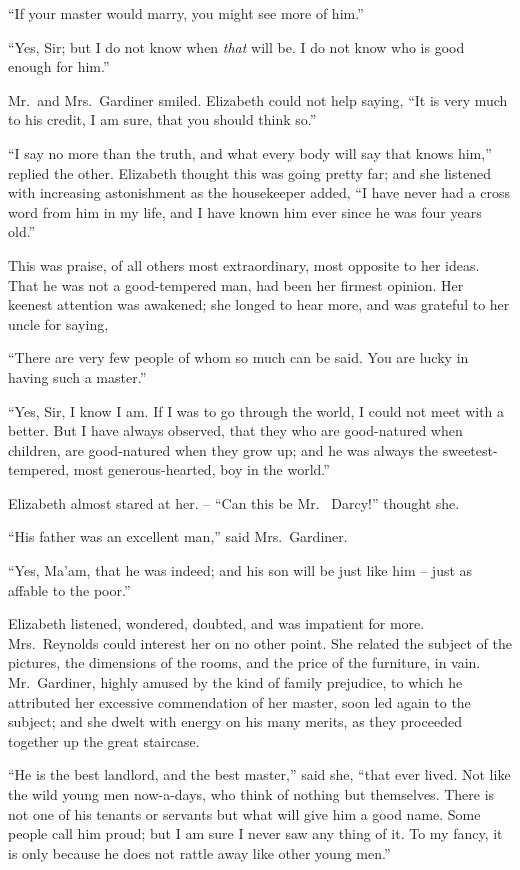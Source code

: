 “If your master would marry, you might see more of
him.”

“Yes, Sir; but I do not know when \textit{that} will be. I do
not know who is good enough for him.”

Mr.\ and Mrs.\ Gardiner smiled. Elizabeth could not
help saying, “It is very much to his credit, I am sure, that
you should think so.”

“I say no more than the truth, and what every body
will say that knows him,” replied the other. Elizabeth
thought this was going pretty far; and she listened with
increasing astonishment as the housekeeper added,
“I have never had a cross word from him in my
life, and I have known him ever since he was four years
old.”

This was praise, of all others most extraordinary, most
opposite to her ideas. That he was not a good-tempered
man, had been her firmest opinion. Her keenest attention
was awakened; she longed to hear more, and was grateful
to her uncle for saying,

“There are very few people of whom so much can be
said. You are lucky in having such a master.”

“Yes, Sir, I know I am. If I was to go through the
world, I could not meet with a better. But I have always
observed, that they who are good-natured when children,
are good-natured when they grow up; and he was always
the sweetest-tempered, most generous-hearted, boy in the
world.”

Elizabeth almost stared at her. -- “Can this be Mr.\ %
Darcy!” thought she.

“His father was an excellent man,” said Mrs.\ Gardiner.

“Yes, Ma’am, that he was indeed; and his son will be
just like him -- just as affable to the poor.”

Elizabeth listened, wondered, doubted, and was impatient
for more. Mrs.\ Reynolds could interest her on no
other point. She related the subject of the pictures, the
dimensions of the rooms, and the price of the furniture,
in vain. Mr.\ Gardiner, highly amused by the kind of
family prejudice, to which he attributed her excessive
commendation of her master, soon led again to the subject;
and she dwelt with energy on his many merits, as they
proceeded together up the great staircase.

“He is the best landlord, and the best master,” said
she, “that ever lived. Not like the wild young men
now-a-days, who think of nothing but themselves. There
is not one of his tenants or servants but what will give
him a good name. Some people call him proud; but
I am sure I never saw any thing of it. To my fancy, it is
only because he does not rattle away like other young
men.”

